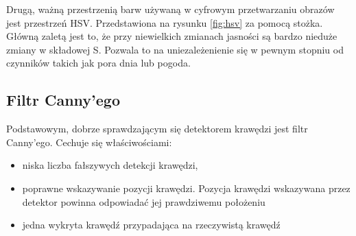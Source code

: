 Drugą, ważną przestrzenią barw używaną w cyfrowym przetwarzaniu obrazów jest przestrzeń HSV. Przedstawiona na rysunku \ref{fig:hsv} za pomocą stożka. Główną zaletą jest to, że przy niewielkich zmianach jasności są bardzo nieduże zmiany w składowej S. Pozwala to na uniezależenienie się w pewnym stopniu od czynników takich jak pora dnia lub pogoda.

\subsection{Filtr Canny'ego}
Podstawowym, dobrze sprawdzającym się detektorem krawędzi jest filtr Canny'ego. Cechuje się właściwościami:

\begin{itemize}
\item niska liczba fałszywych detekcji krawędzi,
\item poprawne wskazywanie pozycji krawędzi. Pozycja krawędzi wskazywana przez detektor powinna odpowiadać jej prawdziwemu położeniu
\item jedna wykryta krawędź przypadająca na rzeczywistą krawędź
\end{itemize}

